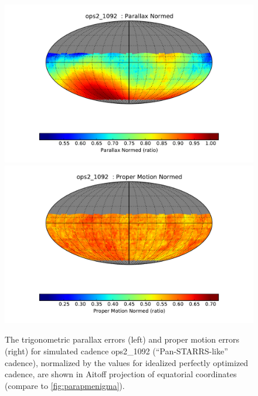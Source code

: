 \begin{figure}[t!]
\vskip -0.03in
\includegraphics[angle=0,width=0.49\hsize:,clip]{figs/ops2_1092_Parallax_Normed__HEAL_SkyMap.pdf}
\includegraphics[angle=0,width=0.49\hsize:,clip]{figs/ops2_1092_Proper_Motion_Normed__HEAL_SkyMap.pdf}
\vskip -0.2in
\caption{The trigonometric parallax errors (left) and proper motion errors (right)  for simulated cadence
ops2\_1092 (``Pan-STARRS-like'' cadence), normalized by the values for idealized perfectly optimized
cadence, are shown in Aitoff projection of equatorial coordinates (compare to \autoref{fig:parapmenigma}).}
\label{fig:parapmenigma2}
\end{figure}

